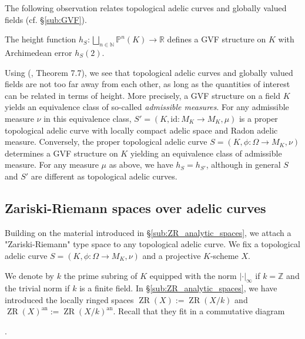 \documentclass [11pt,reqno]{amsart}
\def\bN{{\mathbb{N}}}
\def\bR{{\mathbb{R}}}
\def\bZ{{\mathbb{Z}}}
\newcommand{\1}{\mathmybb{1}}
\def\an{\operatorname{an}}
\def\ZR{\operatorname{ZR}}
\begin{document}
The following observation relates topological adelic curves and globally valued fields (cf. \S \ref{sub:GVF}).

\begin{proposition}
\label{prop:GVF_height}
The height function $h_{S} : \bigsqcup_{n\in \bN} \mathbb{P}^{n}(K) \to \bR$ defines a GVF structure on $K$ with Archimedean error $h_{S}(2)$.
\end{proposition}

\begin{remark}
\label{rem:tac_GVF}
Using (\cite{GVF24}, Theorem 7.7), we see that topological adelic curves and globally valued fields are not too far away from each other, as long as the quantities of interest can be related in terms of height. More precisely, a GVF structure on a field $K$ yields an equivalence class of so-called \emph{admissible measures}. For any admissible measure $\nu$ in this equivalence class, $S'=(K,\mathrm{id} : M_{K}\to M_{K},\mu)$ is a proper topological adelic curve with locally compact adelic space and Radon adelic measure. Conversely, the proper topological adelic curve $S=(K,\phi:\Omega\to M_{K},\nu)$ determines a GVF structure on $K$ yielding an equivalence class of admissible measure. For any measure $\mu$ as above, we have $h_{S}=h_{S'}$, although in general $S$ and $S'$ are different as topological adelic curves. 
\end{remark}

\subsection{Zariski-Riemann spaces over adelic curves}
\label{sub:ZR_spaces_adelic_curves}

Building on the material introduced in \S \ref{sub:ZR_analytic_spaces}, we attach a "Zariski-Riemann" type space to any topological adelic curve. We fix a topological adelic curve $S=(K,\phi:\Omega\to M_{K},\nu)$ and a projective $K$-scheme $X$.

We denote by $k$ the prime subring of $K$ equipped with the norm $|\cdot|_{\infty}$ if $k=\bZ$ and the trivial norm if $k$ is a finite field. In \S \ref{sub:ZR_analytic_spaces}, we have introduced the locally ringed spaces $\ZR(X):=\ZR(X/k)$ and $\ZR(X)^{\an}:=\ZR(X/k)^{\an}$. Recall that they fit in a commutative diagram 
\begin{center}
.
\end{center}
\end{document}
